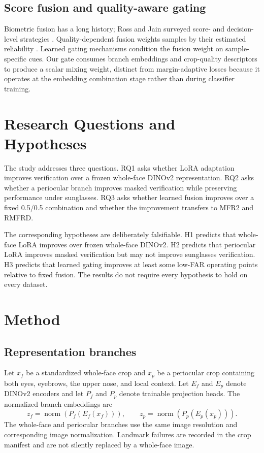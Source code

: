 ﻿\documentclass[10pt,journal,compsoc]{IEEEtran}
\begin{document}
\subsection{Score fusion and quality-aware gating}
Biometric fusion has a long history; Ross and Jain surveyed score- and decision-level strategies \cite{fusionRossJain}. Quality-dependent fusion weights samples by their estimated reliability \cite{quality}. Learned gating mechanisms condition the fusion weight on sample-specific cues. Our gate consumes branch embeddings and crop-quality descriptors to produce a scalar mixing weight, distinct from margin-adaptive losses \cite{magface,adaface} because it operates at the embedding combination stage rather than during classifier training.

\section{Research Questions and Hypotheses}
The study addresses three questions. RQ1 asks whether LoRA adaptation improves verification over a frozen whole-face DINOv2 representation. RQ2 asks whether a periocular branch improves masked verification while preserving performance under sunglasses. RQ3 asks whether learned fusion improves over a fixed 0.5/0.5 combination and whether the improvement transfers to MFR2 and RMFRD.

The corresponding hypotheses are deliberately falsifiable. H1 predicts that whole-face LoRA improves over frozen whole-face DINOv2. H2 predicts that periocular LoRA improves masked verification but may not improve sunglasses verification. H3 predicts that learned gating improves at least some low-FAR operating points relative to fixed fusion. The results do not require every hypothesis to hold on every dataset.

\section{Method}
\subsection{Representation branches}
Let $x_f$ be a standardized whole-face crop and $x_p$ be a periocular crop containing both eyes, eyebrows, the upper nose, and local context. Let $E_f$ and $E_p$ denote DINOv2 encoders and let $P_f$ and $P_p$ denote trainable projection heads. The normalized branch embeddings are
\begin{equation}
 z_f=\operatorname{norm}(P_f(E_f(x_f))),\qquad z_p=\operatorname{norm}(P_p(E_p(x_p))).
\end{equation}
The whole-face and periocular branches use the same image resolution and corresponding image normalization. Landmark failures are recorded in the crop manifest and are not silently replaced by a whole-face image.
\end{document}
